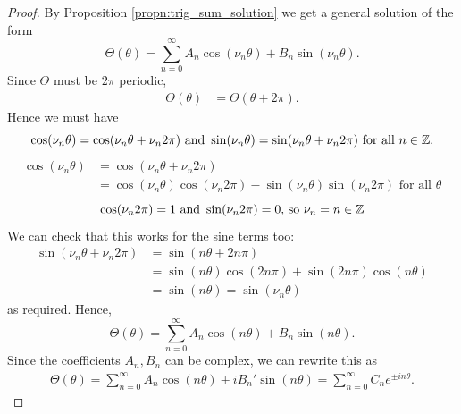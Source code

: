     \begin{proof} By Proposition \ref{propn:trig_sum_solution} we get a general solution of the form 
        \begin{equation}
            \Theta(\theta) = \sum^\infty_{n=0} A_n \cos(\nu_n \theta) + B_n \sin(\nu_n \theta).
        \end{equation} 
    Since $\Theta$ must be $2\pi$ periodic, 
        \begin{align*}
            \Theta(\theta) &= \Theta(\theta + 2\pi).
        \end{align*}
    Hence we must have
        \begin{equation*}
            \cos(\nu_n \theta) = \cos(\nu_n \theta + \nu_n 2 \pi)
            ~\text{and}~
            \sin(\nu_n \theta) = \sin(\nu_n \theta + \nu_n 2 \pi)
            ~\text{for all}~ n \in \mathbb{Z}.
        \end{equation*}
        \begin{align*}
            \cos(\nu_n \theta) &= \cos(\nu_n \theta + \nu_n 2 \pi)\\
            &= \cos(\nu_n \theta) \cos(\nu_n 2 \pi) - \sin(\nu_n \theta) \sin(\nu_n 2 \pi) \text{ for all }\theta
        \end{align*}
        \begin{equation*}
            \cos(\nu_n 2 \pi) = 1
            \text{ and }
            \sin (\nu_n 2 \pi) = 0 \text{, so } \nu_n = n \in \mathbb{Z}
        \end{equation*}
    We can check that this works for the sine terms too:
        \begin{align*}
            \sin(\nu_n \theta + \nu_n 2\pi) 
            &= \sin(n \theta + 2n \pi)\\
            &= \sin(n \theta) \cos(2n\pi) + \sin(2n\pi)\cos(n\theta)\\
            &= \sin(n\theta) = \sin(\nu_n \theta)
        \end{align*}
    as required.
    Hence, 
        \[
        \Theta(\theta) = \sum^\infty_{n=0} A_n \cos(n \theta) + B_n \sin(n \theta).
        \]
    Since the coefficients $A_n, B_n$ can be complex, we can rewrite this as
        \begin{align*}
            \Theta(\theta) 
            = \sum^\infty_{n=0} A_n \cos(n \theta) \pm iB_n' \sin(n \theta)
            = \sum^\infty_{n=0} C_n e^{\pm in\theta}.
        \end{align*}
    \end{proof}\par
%
